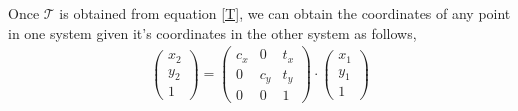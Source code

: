 \documentclass[12pt]{article}
\begin{document}
    Once $\mathcal{T}$ is obtained from equation \ref{T}, we can obtain the coordinates of any point in one system
    given it's coordinates in the other system as follows, 
    \begin{align*}
        \begin{pmatrix}
            x_{2} \\
            y_{2} \\
            1
        \end{pmatrix}
        = 
        \begin{pmatrix}
            c_{x} & 0 & t_{x} \\
            0  & c_{y} & t_{y} \\
            0 & 0 & 1
        \end{pmatrix} \cdot
        \begin{pmatrix}
            x_{1} \\
            y_{1} \\
            1
        \end{pmatrix}
    \end{align*}
    \clearpage
\end{document}
